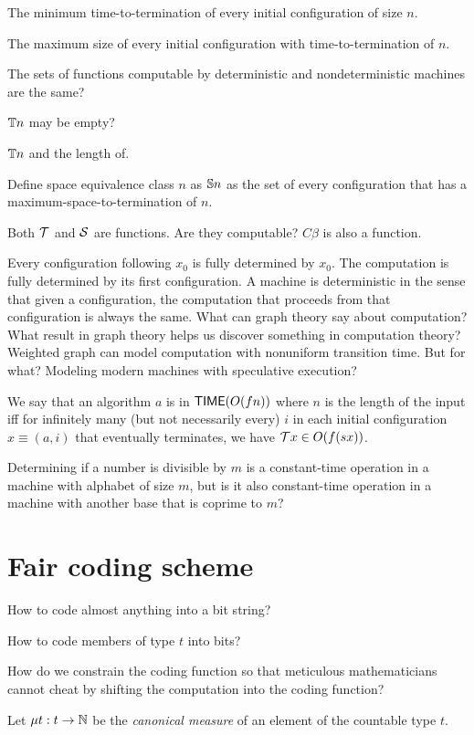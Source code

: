 The minimum time-to-termination of every initial configuration of size $n$.

The maximum size of every initial configuration with time-to-termination of $n$.

The sets of functions computable by deterministic and nondeterministic machines are the same?

$\mathbb{T} n$ may be empty?

$\mathbb{T} n$ and the length of.

Define space equivalence class $n$ as $\mathbb{S} n$ as the set of
every configuration that has a maximum-space-to-termination of $n$.

Both $\mathcal{T}$ and $\mathcal{S}$ are functions.
Are they computable?
$C \beta$ is also a function.

Every configuration following $x_0$ is fully determined by $x_0$.
The computation is fully determined by its first configuration.
A machine is deterministic in the sense that given a configuration,
the computation that proceeds from that configuration is always the same.
What can graph theory say about computation?
What result in graph theory helps us discover something in computation theory?
Weighted graph can model computation with nonuniform transition time.
But for what?
Modeling modern machines with speculative execution?

We say that an algorithm $a$ is in $\operatorname{\mathsf{TIME}}(O(f n))$ where $n$ is the length of the input iff
for infinitely many (but not necessarily every) $i$ in each initial configuration
$x \equiv (a,i)$ that eventually terminates, we have $\mathcal{T} x \in O(f(s x))$.

Determining if a number is divisible by $m$ is a constant-time operation in a machine with alphabet of size $m$,
but is it also constant-time operation in a machine with another base that is coprime to $m$?

\section{Fair coding scheme}

How to code almost anything into a bit string?

How to code members of type $t$ into bits?

How do we constrain the coding function so that meticulous mathematicians
cannot cheat by shifting the computation into the coding function?

Let $\mu t : t \to \mathbb{N}$ be the \emph{canonical measure} of an element of the countable type $t$.

